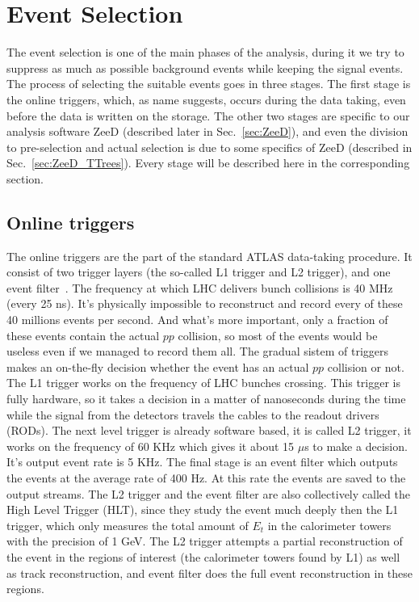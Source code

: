 \chapter{Event Selection}
\label{sec:Selection}

The event selection is one of the main phases of the analysis, during it we try to suppress as much as possible background events while keeping the signal events. The process of selecting the suitable events goes in three stages. The first stage is the online triggers, which, as name suggests, occurs during the data taking, even before the data is written on the storage. The other two stages are specific to our analysis software ZeeD (described later in Sec.~\ref{sec:ZeeD}), and even the division to pre-selection and actual selection is due to some specifics of ZeeD (described in Sec.~\ref{sec:ZeeD_TTrees}). Every stage will be described here in the corresponding section.

\section{Online triggers}
\label{sec:Sel_trig}

The online triggers are the part of the standard ATLAS data-taking procedure. It consist of two trigger layers (the so-called L1 trigger and L2 trigger), and one event filter~\cite{lib:trigger}. The frequency at which LHC delivers bunch collisions is 40 MHz (every 25 ns). It's physically impossible to reconstruct and record every of these 40 millions events per second. And what's more important, only a fraction of these events contain the actual $pp$ collision, so most of the events would be useless even if we managed to record them all. The gradual sistem of triggers makes an on-the-fly decision whether the event has an actual $pp$ collision or not. The L1 trigger works on the frequency of LHC bunches crossing. This trigger is fully hardware, so it takes a decision in a matter of nanoseconds during the time while the signal from the detectors travels the cables to the readout drivers (RODs). The next level trigger is already software based, it is called L2 trigger, it works on the frequency of 60 KHz which gives it about 15 $\mu$s to make a decision. It's output event rate is 5 KHz. The final stage is an event filter which outputs the events at the average rate of 400 Hz. At this rate the events are saved to the output streams. The L2 trigger and the event filter are also collectively called the High Level Trigger (HLT), since they study the event much deeply then the L1 trigger, which only measures the total amount of $E_{t}$ in the calorimeter towers with the precision of 1 GeV. The L2 trigger attempts a partial reconstruction of the event in the regions of interest (the calorimeter towers found by L1) as well as track reconstruction, and event filter does the full event reconstruction in these regions.


